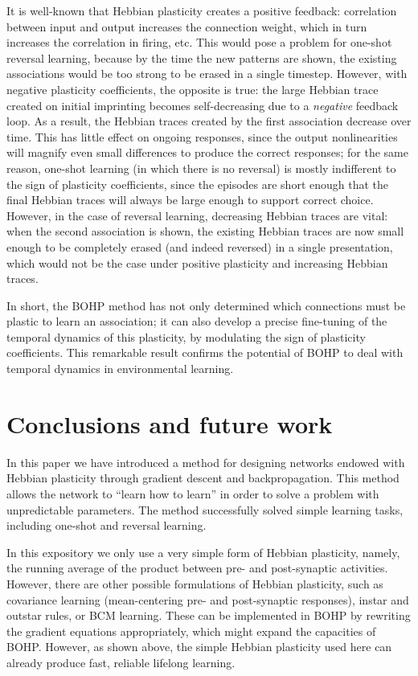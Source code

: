 \documentclass{article}
\begin{document}
It is well-known that Hebbian plasticity
creates a positive feedback: correlation between input and output increases the
connection weight, which in turn increases the correlation in firing, etc. This would
pose a problem for one-shot reversal learning, because by the time the new patterns are
shown, the existing associations would be too strong to be erased in a single
timestep.
However, with negative plasticity coefficients, the opposite is true: the large
Hebbian trace created on initial imprinting becomes self-decreasing due to a
\emph{negative} feedback loop. As a result, the Hebbian traces created by the first
association decrease over time. This has little effect on ongoing responses, since
the output nonlinearities will magnify even small differences to
produce the correct responses; for the same reason, one-shot learning (in which
there is no reversal) is mostly indifferent to the sign of plasticity coefficients,
since the episodes are short enough that the final Hebbian traces will always be
large enough to support correct choice. However, in the case of reversal
learning, decreasing Hebbian traces are vital: when the second association is shown,
the existing Hebbian traces  are now small enough to be completely erased (and
indeed reversed) in a single presentation, which would not be the case under
positive plasticity and increasing Hebbian traces.

In short, the BOHP method has not only determined which connections must be
plastic to learn an association; it can also develop a precise fine-tuning of
the temporal dynamics of this plasticity, by modulating the sign of plasticity
coefficients. This remarkable result confirms the potential of BOHP to deal with
temporal dynamics in environmental learning.



\section{Conclusions and future work}


In this paper we have introduced a method for designing networks endowed with
Hebbian plasticity through gradient descent and backpropagation. This method
allows the network to ``learn how to learn'' in order to solve a problem with
unpredictable parameters. The method successfully solved simple learning tasks, including
one-shot and reversal learning.

In this expository we only use a very simple form of Hebbian plasticity, namely,
the running average of the product between pre- and post-synaptic activities.
However, there are other possible formulations of Hebbian plasticity, such as
covariance learning (mean-centering pre- and post-synaptic responses), instar
and outstar rules, or BCM learning. These can be implemented in BOHP by
rewriting the gradient equations appropriately, which might expand the
capacities of BOHP. However, as shown above, the simple Hebbian plasticity used
here can already produce fast, reliable lifelong learning.
\end{document}
